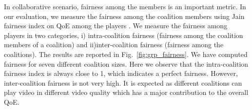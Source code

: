 In collaborative scenario, fairness among the members is an important metric. In our evaluation, we measure the fairness among the coalition members using Jain fairness index on QoE among the players \cite{jain1999throughput}. We measure the fairness among players in two categories, i) intra-coalition fairness (fairness among the coalition members of a coalition) and ii)inter-coalition fairness (fairness among the coalitions). The results are reported in Fig.~\ref{fig:grp_fairness}. We have computed fairness for seven different coalition sizes. Here we observe that the intra-coalition fairness index is always close to 1, which indicates a perfect fairness. However, inter-coalition fairness is not very high. It is expected as different coalitions can play video in different video quality which has a major contribution to the overall QoE. 
